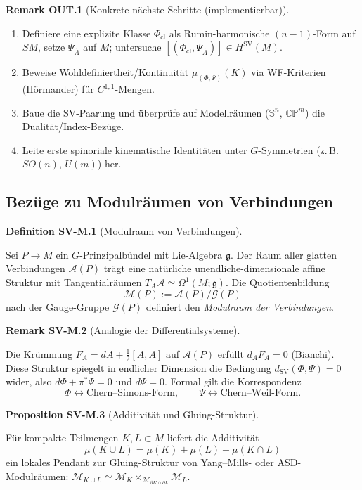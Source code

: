 \documentclass[10pt, letterpaper]{article}
\newcommand{\CustomHeading}[3]{%
  \par\medskip\noindent%
  \textbf{#1 #2} \textnormal{(#3)}.\enskip%
}
\newenvironment{DEF}[2]{\begin{unitbox}\CustomHeading{Definition}{#1}{#2}}{\end{unitbox}}
\newenvironment{PROP}[2]{\begin{unitbox}\CustomHeading{Proposition}{#1}{#2}}{\end{unitbox}}
\newenvironment{REM}[2]{\begin{unitbox}\CustomHeading{Remark}{#1}{#2}}{\end{unitbox}}
\begin{document}
\begin{REM}{OUT.1}{Konkrete nächste Schritte (implementierbar)}
\begin{enumerate}[label=\alph*)]
\item Definiere eine explizite Klasse $\Phi_{\mathrm{cl}}$ als Rumin-harmonische $(n{-}1)$-Form auf $SM$, setze $\Psi_{\widehat A}$ auf $M$;
untersuche $[(\Phi_{\mathrm{cl}},\Psi_{\widehat A})]\in H^{\mathrm{SV}}(M)$.
\item Beweise Wohldefiniertheit/Kontinuität $\mu_{(\Phi,\Psi)}(K)$ via WF-Kriterien (Hörmander) für $C^{1,1}$-Mengen.
\item Baue die SV-Paarung und überprüfe auf Modellräumen ($\mathbb S^n$, $\mathbb{CP}^m$) die Dualität/Index-Bezüge.
\item Leite erste spinoriale kinematische Identitäten unter $G$-Symmetrien (z.\,B.\ $SO(n)$, $U(m)$) her.
\end{enumerate}
\end{REM}


\pagebreak

\subsection{Bezüge zu Modulräumen von Verbindungen}\label{subsec:SV-Moduli}

\begin{DEF}{SV-M.1}{Modulraum von Verbindungen}
Sei $P\to M$ ein $G$-Prinzipalbündel mit Lie-Algebra $\mathfrak g$.
Der Raum aller glatten Verbindungen $\mathcal A(P)$ trägt eine natürliche
unendliche-dimensionale affine Struktur mit Tangentialräumen $T_A\mathcal A\simeq \Omega^1(M;\mathfrak g)$.
Die Quotientenbildung
\[
\mathcal M(P):=\mathcal A(P)/\mathcal G(P)
\]
nach der Gauge-Gruppe $\mathcal G(P)$ definiert den \emph{Modulraum der Verbindungen}.
\end{DEF}

\begin{REM}{SV-M.2}{Analogie der Differentialsysteme}
Die Krümmung $F_A=dA+\tfrac12[A,A]$ auf $\mathcal A(P)$ erfüllt $d_AF_A=0$ (Bianchi).
Diese Struktur spiegelt in endlicher Dimension die Bedingung
$d_{\operatorname{SV}}(\Phi,\Psi)=0$ wider, also $d\Phi+\pi^*\Psi=0$ und $d\Psi=0$.
Formal gilt die Korrespondenz
\[
\Phi \leftrightarrow \text{Chern--Simons-Form},\qquad
\Psi \leftrightarrow \text{Chern--Weil-Form}.
\]
\end{REM}

\begin{PROP}{SV-M.3}{Additivität und Gluing-Struktur}
Für kompakte Teilmengen $K,L\subset M$ liefert die Additivität
\[
\mu(K\cup L)=\mu(K)+\mu(L)-\mu(K\cap L)
\]
ein lokales Pendant zur Gluing-Struktur von Yang--Mills- oder ASD-Modulräumen:
$\mathcal M_{K\cup L}\simeq \mathcal M_K\times_{\mathcal M_{\partial K\cap \partial L}}\mathcal M_L$.
\end{PROP}
\end{document}
